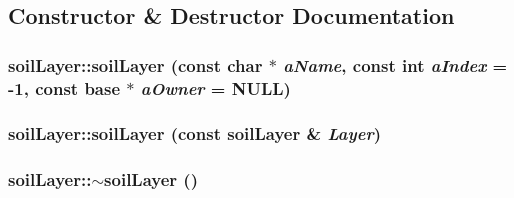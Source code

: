 \subsection{Constructor \& Destructor Documentation}
\hypertarget{classsoil_layer_af5adc704be0dfcaca6210b6217242470}{
\subsubsection[{soilLayer}]{\setlength{\rightskip}{0pt plus 5cm}soilLayer::soilLayer (const char $\ast$ {\em aName}, \/  const int {\em aIndex} = {\ttfamily -\/1}, \/  const {\bf base} $\ast$ {\em aOwner} = {\ttfamily NULL})}}
\label{classsoil_layer_af5adc704be0dfcaca6210b6217242470}
\hypertarget{classsoil_layer_a948fc6fe95c6f89f80c4bc77ff401d7c}{
\subsubsection[{soilLayer}]{\setlength{\rightskip}{0pt plus 5cm}soilLayer::soilLayer (const {\bf soilLayer} \& {\em Layer})}}
\label{classsoil_layer_a948fc6fe95c6f89f80c4bc77ff401d7c}
\hypertarget{classsoil_layer_a7b1d8051966f9fbd7452b1c7dfbdc663}{
\subsubsection[{$\sim$soilLayer}]{\setlength{\rightskip}{0pt plus 5cm}soilLayer::$\sim$soilLayer ()}}
\label{classsoil_layer_a7b1d8051966f9fbd7452b1c7dfbdc663}


